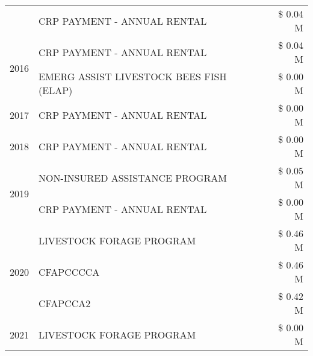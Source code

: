 \begin{tabular}{llr}
 & CRP PAYMENT - ANNUAL RENTAL & \$ 0.04 M \\
\cline{1-3}
\multirow[t]{2}{*}{2016} & CRP PAYMENT - ANNUAL RENTAL & \$ 0.04 M \\
 & EMERG ASSIST LIVESTOCK BEES FISH (ELAP) & \$ 0.00 M \\
\cline{1-3}
2017 & CRP PAYMENT - ANNUAL RENTAL & \$ 0.00 M \\
\cline{1-3}
2018 & CRP PAYMENT - ANNUAL RENTAL & \$ 0.00 M \\
\cline{1-3}
\multirow[t]{2}{*}{2019} & NON-INSURED ASSISTANCE PROGRAM & \$ 0.05 M \\
 & CRP PAYMENT - ANNUAL RENTAL & \$ 0.00 M \\
\cline{1-3}
\multirow[t]{3}{*}{2020} & LIVESTOCK FORAGE PROGRAM & \$ 0.46 M \\
 & CFAPCCCCA & \$ 0.46 M \\
 & CFAPCCA2 & \$ 0.42 M \\
\cline{1-3}
2021 & LIVESTOCK FORAGE PROGRAM & \$ 0.00 M \\
\cline{1-3}
\bottomrule
\end{tabular}
